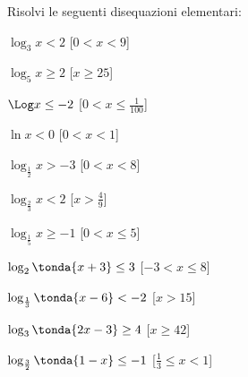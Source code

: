 \begin{esercizio}\label{ese:}
 Risolvi le seguenti disequazioni elementari:
 \begin{multicols}{2}
 \begin{enumeratea}
   \item \(\log_3 x < 2\)
   \hfill [\( 0<x<9\)]
   \item \(\log_5 x \geq 2\)
   \hfill [\(x\geq 25\)]
   \item \(\Log x \leq -2\)
   \hfill [\( 0<x\leq \frac{1}{100}\)]
   \item \(\ln x < 0\)
   \hfill [\( 0 < x <1\)]
   \item \(\log_{\frac{1}{2}} x > -3\)
   \hfill [\(0<x<8\)]
   \item \(\log_{\frac{2}{3}} x < 2\)
   \hfill [\( x>\frac{4}{9}\)]
   \item \(\log_{\frac{1}{5}} x \geq -1\)
   \hfill [\(0<x\leq 5\)]
   \item \(\log_2 \tonda{x+3} \leq 3\)
   \hfill [\(-3<x\leq 8\)]
   \item \(\log_{\frac{1}{3}} \tonda{x-6} < -2\)
   \hfill [\(x>15\)]
   \item \(\log_3 \tonda{2x-3}\geq 4\)
   \hfill [\(x \geq 42\)]
   \item \(\log_{\frac{3}{2}} \tonda{1-x} \leq -1\)
   \hfill [\(\frac{1}{3}\leq x <1\)]
  
 \end{enumeratea}
 \end{multicols}
\end{esercizio}



